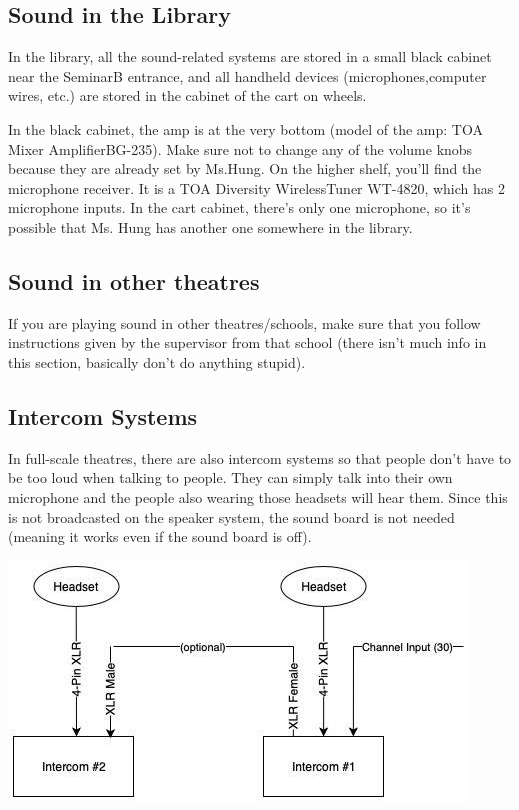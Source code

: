 \documentclass{article}
\begin{document}
\subsection{Sound in the Library}
In the library, all the sound-related systems are stored in a small black cabinet near the SeminarB entrance, and all handheld devices (microphones,computer wires, etc.) are stored in the cabinet of the cart on wheels.

In the black cabinet, the amp is at the very bottom (model of the amp: TOA Mixer AmplifierBG-235). Make sure not to change any of the volume knobs because they are already set by Ms.Hung. On the higher shelf, you’ll find the microphone receiver. It is a TOA Diversity WirelessTuner WT-4820, which has 2 microphone inputs. In the cart cabinet, there’s only one microphone, so it’s possible that Ms. Hung has another one somewhere in the library.

\subsection{Sound in other theatres}
If you are playing sound in other theatres/schools, make sure that you follow instructions given by the supervisor from that school (there isn’t much info in this section, basically don’t do anything stupid).

\subsection{Intercom Systems}
In full-scale theatres, there are also intercom systems so that people don’t have to be too loud when talking to people. They can simply talk into their own microphone and the people also wearing those headsets will hear them. Since this is not broadcasted on the speaker system, the sound board is not needed (meaning it works even if the sound board is off).

\begin{center}
    \includegraphics[width=\textwidth, keepaspectratio]{Intercom_Wiring.jpg}
\end{center}
\end{document}
